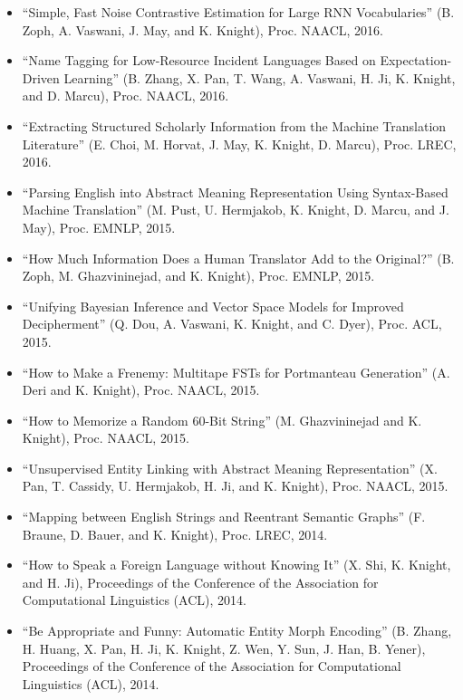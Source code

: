 \begin{itemize}
\item ``Simple, Fast Noise Contrastive Estimation for Large RNN Vocabularies'' (B. Zoph, A. Vaswani, J. May, and K. Knight), Proc. NAACL, 2016. 

\item ``Name Tagging for Low-Resource Incident Languages Based on Expectation-Driven Learning'' (B. Zhang, X. Pan, T. Wang, A. Vaswani, H. Ji, K. Knight, and D. Marcu), Proc. NAACL, 2016. 

\item ``Extracting Structured Scholarly Information from the Machine Translation Literature'' (E. Choi, M. Horvat, J. May, K. Knight, D. Marcu), Proc. LREC, 2016. 

\item ``Parsing English into Abstract Meaning Representation Using
Syntax-Based Machine Translation''
(M. Pust, U. Hermjakob, K. Knight, D. Marcu, and J. May), Proc. EMNLP, 2015.

\item ``How Much Information Does a Human Translator Add to the Original?''
(B. Zoph, M. Ghazvininejad, and K. Knight), Proc. EMNLP, 2015.

\item ``Unifying Bayesian Inference and Vector Space Models for Improved Decipherment'' (Q. Dou, A. Vaswani, K. Knight, and C. Dyer), Proc. ACL, 2015.

\item ``How to Make a Frenemy: Multitape FSTs for Portmanteau Generation''
(A. Deri and K. Knight), Proc. NAACL, 2015.

\item ``How to Memorize a Random 60-Bit String''
(M. Ghazvininejad and K. Knight), Proc. NAACL, 2015.

\item ``Unsupervised Entity Linking with Abstract Meaning Representation''
(X. Pan, T. Cassidy, U. Hermjakob, H. Ji, and K. Knight), Proc. NAACL, 2015.

\item ``Mapping between English Strings and Reentrant Semantic Graphs'' (F. Braune, D. Bauer, and K. Knight), Proc. LREC, 2014. 

\item ``How to Speak a Foreign Language without Knowing It'' (X. Shi, K. Knight, and H. Ji), 
Proceedings of the Conference of the 
Association for Computational Linguistics (ACL), 2014.

\item ``Be Appropriate and Funny: Automatic Entity Morph Encoding'' (B. Zhang, H. Huang, X. Pan, H. Ji, K. Knight, Z. Wen, Y. Sun, J. Han, B. Yener), 
Proceedings of the Conference of the 
Association for Computational Linguistics (ACL), 2014.


\end{itemize}
